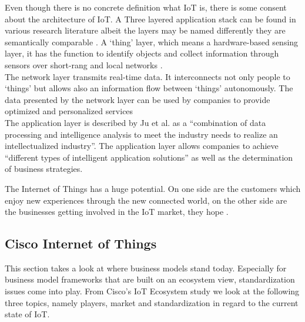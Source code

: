 	Even though there is no concrete definition what IoT is, there is some consent about the architecture of IoT. A Three layered application stack can be found in various research literature albeit the layers may be named differently they are semantically comparable . A `thing' layer, which means a hardware-based sensing layer, it has the function to identify objects and collect information through sensors over short-rang and local networks \cite{ju}.\\
	The network layer transmits real-time data. It interconnects not only people to `things' but allows also an information flow between `things' autonomously. The data presented by the network layer can be used by companies to provide optimized and personalized services \cite{ju}\\
	The application layer is described by Ju et al. as a ``combination of data processing and intelligence analysis to meet the industry needs to realize an intellectualized industry''. The application layer allows companies to achieve ``different types of intelligent application solutions'' as well as the determination of business strategies\cite{ju}.

	The Internet of Things has a huge potential. On one side are the customers which enjoy new experiences through the new connected world, on the other side are the businesses getting involved in the IoT market, they hope \cite{ju}.\\
	

	\subsection{Cisco Internet of Things}
		This section takes a look at where business models stand today. Especially for business model frameworks that are built on an ecosystem view, standardization issues come into play. From Cisco's IoT Ecosystem study we look at the following three topics, namely players, market and standardization in regard to the current state of IoT.

